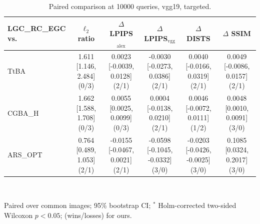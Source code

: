 \begin{table}[t]
\centering\footnotesize
\caption{Paired comparison at 10000 queries, vgg19, targeted.}
\begin{tabular}{lccccc}
\toprule
LGC\_RC\_EGC vs. & $\ell_2$ ratio & $\Delta$ LPIPS$_{\mathrm{alex}}$ & $\Delta$ LPIPS$_{\mathrm{vgg}}$ & $\Delta$ DISTS & $\Delta$ SSIM \\
\midrule
TtBA & 1.611 [1.146, 2.484] (0/3) & 0.0023 [-0.0039, 0.0128] (2/1) & -0.0030 [-0.0273, 0.0386] (2/1) & 0.0040 [-0.0166, 0.0319] (2/1) & 0.0049 [-0.0086, 0.0157] (2/1) \\
CGBA\_H & 1.662 [1.588, 1.708] (0/3) & 0.0055 [0.0025, 0.0099] (0/3) & 0.0004 [-0.0138, 0.0210] (2/1) & 0.0046 [-0.0072, 0.0111] (1/2) & 0.0048 [0.0010, 0.0091] (3/0) \\
ARS\_OPT & 0.764 [0.489, 1.053] (2/1) & -0.0155 [-0.0467, 0.0021] (2/1) & -0.0598 [-0.1045, -0.0332] (3/0) & -0.0203 [-0.0426, -0.0025] (3/0) & 0.1085 [0.0324, 0.2017] (3/0) \\
\bottomrule
\end{tabular}
\\[2pt]\parbox{\linewidth}{\scriptsize Paired over common images; 95\% bootstrap CI; $^{*}$ Holm-corrected two-sided Wilcoxon $p<0.05$; (wins/losses) for ours.}
\end{table}

